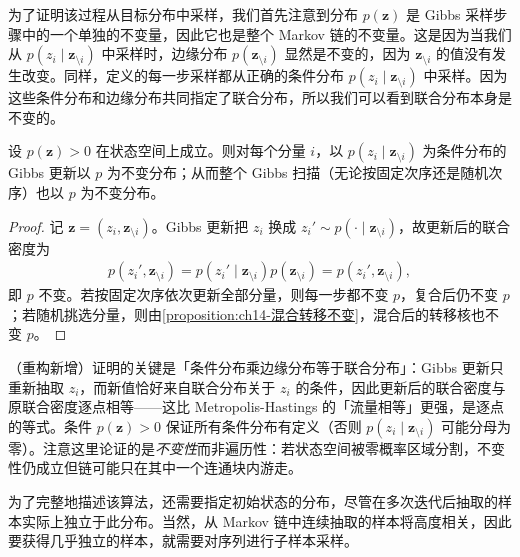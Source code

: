 \documentclass[../../main.tex]{subfiles}
\begin{document}
为了证明该过程从目标分布中采样，我们首先注意到分布 $p(\bm{z})$ 是 Gibbs 采样步骤中的一个单独的不变量，因此它也是整个 Markov 链的不变量。这是因为当我们从 $p\!\left(z_{i}\mid\bm{z}_{\setminus i}\right)$ 中采样时，边缘分布 $p\!\left(\bm{z}_{\setminus i}\right)$ 显然是不变的，因为 $\bm{z}_{\setminus i}$ 的值没有发生改变。同样，定义的每一步采样都从正确的条件分布 $p\!\left(z_{i}\mid\bm{z}_{\setminus i}\right)$ 中采样。因为这些条件分布和边缘分布共同指定了联合分布，所以我们可以看到联合分布本身是不变的。

\begin{proposition}\label{proposition:ch14-gibbs不变性}
设 $p(\bm{z})>0$ 在状态空间上成立。则对每个分量 $i$，以 $p\!\left(z_{i}\mid\bm{z}_{\setminus i}\right)$ 为条件分布的 Gibbs 更新以 $p$ 为不变分布；从而整个 Gibbs 扫描（无论按固定次序还是随机次序）也以 $p$ 为不变分布。
\end{proposition}

\begin{proof}
记 $\bm{z}=\left(z_{i},\bm{z}_{\setminus i}\right)$。Gibbs 更新把 $z_{i}$ 换成 $z_{i}'\sim p\!\left(\cdot\mid\bm{z}_{\setminus i}\right)$，故更新后的联合密度为
\begin{align*}
p\!\left(z_{i}',\bm{z}_{\setminus i}\right)=p\!\left(z_{i}'\mid\bm{z}_{\setminus i}\right)p\!\left(\bm{z}_{\setminus i}\right)=p\!\left(z_{i}',\bm{z}_{\setminus i}\right),
\end{align*}
即 $p$ 不变。若按固定次序依次更新全部分量，则每一步都不变 $p$，复合后仍不变 $p$；若随机挑选分量，则由\cref{proposition:ch14-混合转移不变}，混合后的转移核也不变 $p$。
\end{proof}

\begin{remark}（重构新增）证明的关键是「条件分布乘边缘分布等于联合分布」：Gibbs 更新只重新抽取 $z_{i}$，而新值恰好来自联合分布关于 $z_{i}$ 的条件，因此更新后的联合密度与原联合密度逐点相等——这比 Metropolis-Hastings 的「流量相等」更强，是逐点的等式。条件 $p(\bm{z})>0$ 保证所有条件分布有定义（否则 $p\!\left(z_{i}\mid\bm{z}_{\setminus i}\right)$ 可能分母为零）。注意这里论证的是\emph{不变性}而非遍历性：若状态空间被零概率区域分割，不变性仍成立但链可能只在其中一个连通块内游走。
\end{remark}

为了完整地描述该算法，还需要指定初始状态的分布，尽管在多次迭代后抽取的样本实际上独立于此分布。当然，从 Markov 链中连续抽取的样本将高度相关，因此要获得几乎独立的样本，就需要对序列进行子样本采样。
\end{document}
